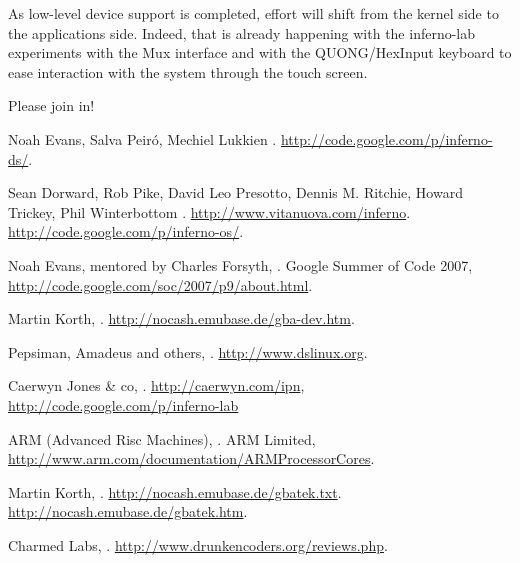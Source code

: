 \documentclass[11pt]{p9article}
\newcommand{\hrefx}[1]{\href{#1}{#1}} %
\begin{document}
As low-level device support is completed, effort will shift from the kernel side to the applications side.
Indeed, that is already happening with the inferno-lab \cite{caerwyn-ipn} experiments with the Mux interface and
with the QUONG/HexInput \cite{hexinput} keyboard to ease interaction with the system through the touch screen.

Please join in! \cite{inferno-ds}
	

\begin{thebibliography}{1}

	Noah Evans, Salva Peiró, Mechiel Lukkien
	.
	\hrefx{http://code.google.com/p/inferno-ds/}.

	Sean Dorward, Rob Pike, David Leo Presotto, Dennis M. Ritchie, Howard Trickey, Phil Winterbottom
	.
	\hrefx{http://www.vitanuova.com/inferno}.
	\hrefx{http://code.google.com/p/inferno-os/}.

	Noah Evans, mentored by Charles Forsyth,
	.
	\newblock Google Summer of Code 2007,
	\newblock \hrefx{http://code.google.com/soc/2007/p9/about.html}.

	Martin Korth,
	.
	\hrefx{http://nocash.emubase.de/gba-dev.htm}.

	Pepsiman, Amadeus and others,
	.
	\hrefx{http://www.dslinux.org}.
	
	Caerwyn Jones \& co,
	.
	\newblock \hrefx{http://caerwyn.com/ipn}, \hrefx{http://code.google.com/p/inferno-lab}

	ARM (Advanced Risc Machines),
	.
	\newblock ARM Limited,
	\newblock \hrefx{http://www.arm.com/documentation/ARMProcessorCores}.
	
	Martin Korth,
	.
	\hrefx{http://nocash.emubase.de/gbatek.txt}.
	\hrefx{http://nocash.emubase.de/gbatek.htm}.

	Charmed Labs,
	.
	\hrefx{http://www.drunkencoders.org/reviews.php}.


\end{thebibliography}
\end{document}
